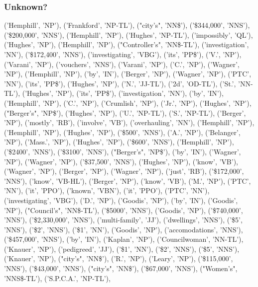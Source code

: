 \documentclass[10pt]{beamer}
\begin{document}
\begin{frame}[fragile]
  \frametitle{Unknown?}


  ('Hemphill', 'NP'), ('Frankford', 'NP-TL'), ("city's", 'NN\$'), ('\$344,000', 'NNS'), ('\$200,000', 'NNS'), ('Hemphill', 'NP'), ('Hughes', 'NP-TL'), ('impossibly', 'QL'), ('Hughes', 'NP'), ('Hemphill', 'NP'), ("Controller's", 'NN\$-TL'), ('investigation', 'NN'), ('\$172,400', 'NNS'), ('investigating', 'VBG'), ('its', 'PP\$'), ('V.', 'NP'), ('Varani', 'NP'), ('vouchers', 'NNS'), ('Varani', 'NP'), ('C.', 'NP'), ('Wagner', 'NP'), ('Hemphill', 'NP'), ('by', 'IN'), ('Berger', 'NP'), ('Wagner', 'NP'), ('PTC', 'NN'), ('its', 'PP\$'), ('Hughes', 'NP'), ('N.', 'JJ-TL'), ('2d', 'OD-TL'), ('St.', 'NN-TL'), ('Hughes', 'NP'), ('its', 'PP\$'), ('investigation', 'NN'), ('by', 'IN'), ('Hemphill', 'NP'), ('C.', 'NP'), ('Crumlish', 'NP'), ('Jr.', 'NP'), ('Hughes', 'NP'), ("Berger's", 'NP\$'), ('Hughes', 'NP'), ('U.', 'NP-TL'), ('S.', 'NP-TL'), ('Berger', 'NP'), ('mostly', 'RB'), ('involve', 'VB'), ('overhauling', 'NN'), ('Hemphill', 'NP'), ('Hemphill', 'NP'), ('Hughes', 'NP'), ('\$500', 'NNS'), ('A.', 'NP'), ('Belanger', 'NP'), ('Mass.', 'NP'), ('Hughes', 'NP'), ('\$600', 'NNS'), ('Hemphill', 'NP'), ('\$2400', 'NNS'), ('\$3100', 'NNS'), ("Berger's", 'NP\$'), ('by', 'IN'), ('Wagner', 'NP'), ('Wagner', 'NP'), ('\$37,500', 'NNS'), ('Hughes', 'NP'), ('know', 'VB'), ('Wagner', 'NP'), ('Berger', 'NP'), ('Wagner', 'NP'), ('just', 'RB'), ('\$172,000', 'NNS'), ('know', 'VB-HL'), ('Berger', 'NP'), ('know', 'VB'), ('M.', 'NP'), ('PTC', 'NN'), ('it', 'PPO'), ('known', 'VBN'), ('it', 'PPO'), ('PTC', 'NN'), ('investigating', 'VBG'), ('D.', 'NP'), ('Goodis', 'NP'), ('by', 'IN'), ('Goodis', 'NP'), ("Council's", 'NN\$-TL'), ('\$5000', 'NNS'), ('Goodis', 'NP'), ('\$740,000', 'NNS'), ('\$2,330,000', 'NNS'), ('multi-family', 'JJ'), ('dwellings', 'NNS'), ('\$5', 'NNS'), ('\$2', 'NNS'), ('\$1', 'NN'), ('Goodis', 'NP'), ('accomodations', 'NNS'), ('\$457,000', 'NNS'), ('by', 'IN'), ('Kaplan', 'NP'), ('Councilwoman', 'NN-TL'), ('Knauer', 'NP'), ('pedigreed', 'JJ'), ('\$1', 'NN'), ('\$2', 'NNS'), ('\$5', 'NNS'), ('Knauer', 'NP'), ("city's", 'NN\$'), ('R.', 'NP'), ('Leary', 'NP'), ('\$115,000', 'NNS'), ('\$43,000', 'NNS'), ("city's", 'NN\$'), ('\$67,000', 'NNS'), ("Women's", 'NNS\$-TL'), ('S.P.C.A.', 'NP-TL'),


\end{frame}
\end{document}
